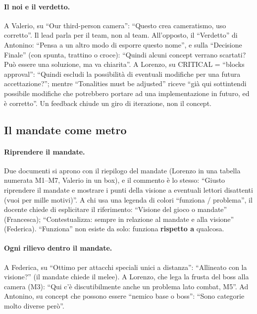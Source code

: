 \paragraph{Il noi e il verdetto.} A Valerio, su ``Our third-person camera'':
``Questo crea cameratismo, uso corretto''. Il lead parla per il team, non al
team. All'opposto, il ``Verdetto'' di Antonino: ``Pensa a un altro modo di
esporre questo nome'', e sulla ``Decisione Finale'' (con spunta, trattino o
croce): ``Quindi alcuni concept verrano scartati? Può essere una soluzione, ma
va chiarita''. A Lorenzo, su CRITICAL = ``blocks approval'': ``Quindi escludi
la possibilità di eventuali modifiche per una futura accettazione?''; mentre
``Tonalities must be adjusted'' riceve ``già qui sottintendi possibile
modifiche che potrebbero portare ad una implementazione in futuro, ed è
corretto''. Un feedback chiude un giro di iterazione, non il concept.

\subsection{Il mandate come metro}
\label{rv:t6:sec:mandate}

\paragraph{Riprendere il mandate.} Due documenti si aprono con il riepilogo
del mandate (Lorenzo in una tabella numerata M1--M7, Valerio in un box), e il
commento è lo stesso: ``Giusto riprendere il mandate e mostrare i punti della
visione a eventuali lettori disattenti (vuoi per mille motivi)''. A chi usa
una legenda di colori ``funziona / problema'', il docente chiede di
esplicitare il riferimento: ``Visione del gioco o mandate'' (Francesca);
``Contestualizza: sempre in relazione al mandate e alla visione''
(Federica). ``Funziona'' non esiste da solo: funziona \textbf{rispetto a}
qualcosa.

\paragraph{Ogni rilievo dentro il mandate.} A Federica, su ``Ottimo per
attacchi speciali unici a distanza'': ``Allineato con la visione?'' (il
mandate chiede il melee). A Lorenzo, che lega la frusta del boss alla camera
(M3): ``Qui c'è discutibilmente anche un problema lato combat, M5''. Ad
Antonino, su concept che possono essere ``nemico base o boss'': ``Sono
categorie molto diverse però''.

